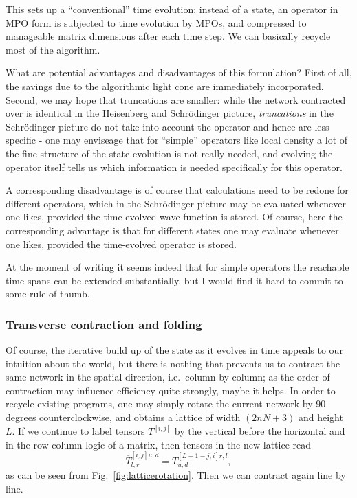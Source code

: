\documentclass[a4paper,10pt,oneside,onecolumn,1p,times]{elsarticle}
\begin{document}
This sets up a ``conventional'' time evolution: instead of a state, an operator in MPO form is subjected to time evolution by MPOs, and compressed to manageable matrix dimensions after each time step. We can basically recycle most of the algorithm. 

What are potential advantages and disadvantages of this formulation? First of all, the savings due to the algorithmic light cone are immediately incorporated. Second, we may hope that truncations are smaller: while the network contracted over is identical in the Heisenberg and Schr\"{o}dinger picture, {\em truncations} in the Schr\"{o}dinger picture do not take into account the operator and hence are less specific - one may enviseage that for ``simple'' operators like local density a lot of the fine structure of the state evolution is not really needed, and evolving the operator itself tells us which information is needed specifically for this operator. 

A corresponding disadvantage is of course that calculations need to be redone for different operators, which in the Schr\"{o}dinger picture may be evaluated whenever one likes, provided the time-evolved wave function is stored. Of course, here the corresponding advantage is that for different states one may evaluate whenever one likes, provided the time-evolved operator is stored. 

At the moment of writing it seems indeed that for simple operators the reachable time spans can be extended substantially, but I would find it hard to commit to some rule of thumb. 

\subsubsection{Transverse contraction and folding}

Of course, the iterative build up of the state as it evolves in time appeals to our intuition about the world, but there is nothing that prevents us to contract the same network in the spatial direction, i.e.\ column by column; as the order of contraction may influence efficiency quite strongly, maybe it helps. In order to recycle existing programs, one may simply rotate the current network by 90 degrees counterclockwise, and obtains a lattice of width $(2nN+3)$ and height $L$. If we continue to label tensors $T^{[i,j]}$ by the vertical before the horizontal and in the row-column logic of a matrix, then tensors in the new lattice read
\begin{equation}
\overline{T}^{[i,j] u,d}_{l,r} = T^{[L+1-j,i] r,l}_{u,d} ,
\end{equation}
as can be seen from Fig.~\ref{fig:latticerotation}. Then we can contract again line by line.
\end{document}
